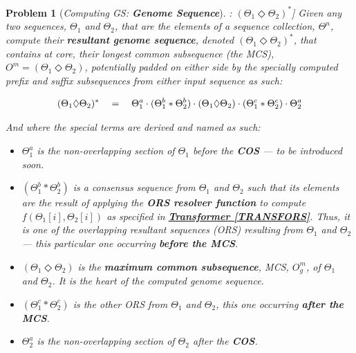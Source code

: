 \documentclass[a4paper, 18pt]{article} %
\newtheorem{prob}{Problem}
\begin{document}
\begin{prob}[\textit{Computing GS: \textbf{Genome Sequence}}]: $(\Theta_1 \Diamond \Theta_2)^*$] 
\label{PROBGS}
Given any two sequences, $\Theta_1$ and $\Theta_2$, that are the elements of a sequence collection, $\Theta^n$, compute their \textbf{resultant genome sequence}, denoted $(\Theta_1 \Diamond \Theta_2)^*$, that contains at core, their longest common subsequence (the MCS), $O^m = (\Theta_1 \Diamond \Theta_2)$, potentially padded on either side by the specially computed prefix and suffix subsequences from either input sequence as such:

\vspace{1em}
\begin{equation}
\label{EQGS}
(\Theta_1 \Diamond \Theta_2)^* \quad = \quad \Theta_1^a\cdot(\Theta_1^b \ast \Theta_2^b)\cdot(\Theta_1 \Diamond \Theta_2)\cdot(\Theta_1^c \ast \Theta_2^c)\cdot\Theta_2^a\\\\
\end{equation}
\vspace{1em}

And where the special terms are derived and named as such:

\begin{itemize}
\item $\Theta_1^a$ is the non-overlapping section of $\Theta_1$ before the \textbf{COS} --- to be introduced soon.
\item $(\Theta_1^b \ast \Theta_2^b)$ is a consensus sequence from $\Theta_1$ and $\Theta_2$ such that its elements are the result of applying the \textbf{ORS resolver function} to compute $f(\Theta_1[i],\Theta_2[i])$ as specified in \textbf{\hyperref[TRANSFORS]{Transformer \ref{TRANSFORS}}}. Thus, it is one of the overlapping resultant sequences (ORS) resulting from $\Theta_1$ and $\Theta_2$ --- this particular one occurring \textbf{before the MCS}.
\item $(\Theta_1 \Diamond \Theta_2)$ is the \textbf{maximum common subsequence}, MCS, $O^m_g$, of $\Theta_1$ and $\Theta_2$. It is the heart of the computed genome sequence.
\item $(\Theta_1^c \ast \Theta_2^c)$ is the other ORS from $\Theta_1$ and $\Theta_2$, this one occurring  \textbf{after the MCS}.
\item  $\Theta_2^a$ is the non-overlapping section of $\Theta_2$ after the \textbf{COS}.
\end{itemize}


\end{prob}
\end{document}
